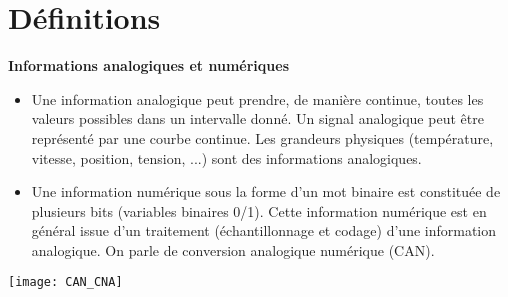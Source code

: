 \fichetrue
\proftrue
\tdfalse
\coursfalse



\def\xxnumchapitre{Chapitre 2 \vspace{.2cm}}
\def\xxchapitre{\hspace{.12cm} Définitions préliminaires et détermination des performances}
\def\xxYCartouche{-2.25cm}
\def\xxposongletx{2}
\def\xxposonglettext{1.45}
\def\xxposonglety{19}%

\def\xxonglet{Cy 01 -- Ch 2}

\def\xxactivite{Fiche}


\def\xxpied{%
Cycle 01 -- Modéliser le comportement des systèmes multiphysiques\\
Ch 2 -- \xxactivite%
}

\setcounter{secnumdepth}{5}

\iflivret

\else

\fi
\vspace{.5cm}
\pagestyle{fancy}
\thispagestyle{plain}
\setcounter{section}{0}


\section{Définitions}



\begin{defi}\textbf{Informations analogiques et numériques} ~\\
\begin{itemize}[label=,font=\color{bleuxp}] 
\item Une information analogique peut prendre, de manière continue, toutes les valeurs
possibles dans un intervalle donné. Un signal analogique peut être représenté
par une courbe continue. Les grandeurs physiques (température, vitesse,
position, tension, ...) sont des informations analogiques.

\item Une information numérique sous la forme d'un mot binaire est constituée de
plusieurs bits (variables binaires 0/1). Cette information numérique est en
général issue d'un traitement (échantillonnage et codage) d'une information
analogique. On parle de conversion analogique numérique (CAN).
\end{itemize}
\end{defi}

\begin{center}
\texttt{[image: CAN\_CNA]}

\end{center}




